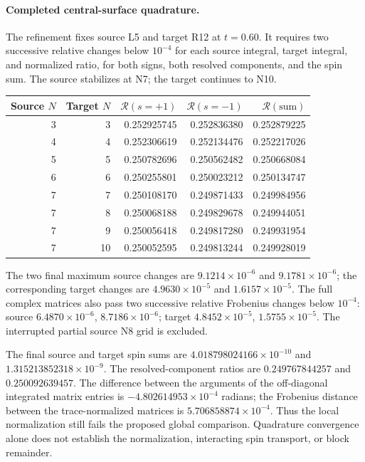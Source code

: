 \paragraph{Completed central-surface quadrature.}
The refinement fixes source L5 and target R12 at $t=0.60$.
It requires two successive relative changes below $10^{-4}$
for each source integral, target integral, and normalized ratio,
for both signs, both resolved components, and the spin sum.
The source stabilizes at N7; the target continues to N10.
\begin{center}
\begin{tabular}{rrrrr}
\toprule
Source $N$ & Target $N$ & $\mathcal R(s=+1)$ & $\mathcal R(s=-1)$ & $\mathcal R(\text{sum})$\\
\midrule
3 & 3 & 0.252925745 & 0.252836380 & 0.252879225\\
4 & 4 & 0.252306619 & 0.252134476 & 0.252217026\\
5 & 5 & 0.250782696 & 0.250562482 & 0.250668084\\
6 & 6 & 0.250255801 & 0.250023212 & 0.250134747\\
7 & 7 & 0.250108170 & 0.249871433 & 0.249984956\\
7 & 8 & 0.250068188 & 0.249829678 & 0.249944051\\
7 & 9 & 0.250056418 & 0.249817280 & 0.249931954\\
7 & 10 & 0.250052595 & 0.249813244 & 0.249928019\\
\bottomrule
\end{tabular}
\end{center}
The two final maximum source changes are
$9.1214\times10^{-6}$ and $9.1781\times10^{-6}$;
the corresponding target changes are $4.9630\times10^{-5}$
and $1.6157\times10^{-5}$. The full complex matrices also pass
two successive relative Frobenius changes below $10^{-4}$:
source $6.4870\times10^{-6}$, $8.7186\times10^{-6}$;
target $4.8452\times10^{-5}$, $1.5755\times10^{-5}$.
The interrupted partial source N8 grid is excluded.

The final source and target spin sums are
$4.018798024166\times10^{-10}$ and
$1.315213852318\times10^{-9}$.
The resolved-component ratios are $0.249767844257$ and
$0.250092639457$. The difference between the arguments of the
off-diagonal integrated matrix entries is
$-4.802614953\times10^{-4}$ radians; the Frobenius distance
between the trace-normalized matrices is
$5.706858874\times10^{-4}$.
Thus the local normalization still fails the proposed global
comparison. Quadrature convergence alone does not establish the
normalization, interacting spin transport, or block remainder.

